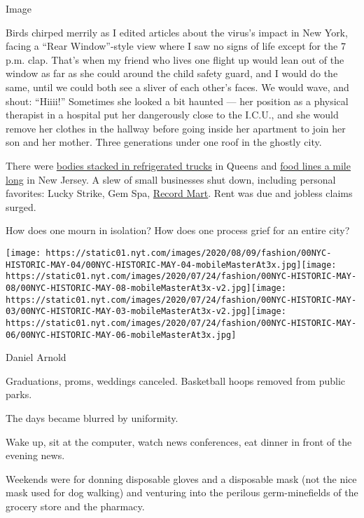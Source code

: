 Image

Birds chirped merrily as I edited articles about the virus's impact in
New York, facing a ``Rear Window''-style view where I saw no signs of
life except for the 7 p.m. clap. That's when my friend who lives one
flight up would lean out of the window as far as she could around the
child safety guard, and I would do the same, until we could both see a
sliver of each other's faces. We would wave, and shout: ``Hiiii!''
Sometimes she looked a bit haunted --- her position as a physical
therapist in a hospital put her dangerously close to the I.C.U., and she
would remove her clothes in the hallway before going inside her
apartment to join her son and her mother. Three generations under one
roof in the ghostly city.

There were
\href{https://www.nytimes.com/2020/04/30/nyregion/coronavirus-nyc-funeral-home-morgue-bodies.html}{bodies
stacked in refrigerated trucks} in Queens and
\href{https://www.nytimes.com/2020/04/30/nyregion/coronavirus-nj-hunger.html}{food
lines a mile long} in New Jersey. A slew of small businesses shut down,
including personal favorites: Lucky Strike, Gem Spa,
\href{https://untappedcities.com/2020/06/10/closed-record-mart-manhattans-oldest-record-store-located-in-times-square-subway-station/}{Record
Mart}. Rent was due and jobless claims surged.

How does one mourn in isolation? How does one process grief for an
entire city?

\texttt{[image: https://static01.nyt.com/images/2020/08/09/fashion/00NYC-HISTORIC-MAY-04/00NYC-HISTORIC-MAY-04-mobileMasterAt3x.jpg]}\texttt{[image: https://static01.nyt.com/images/2020/07/24/fashion/00NYC-HISTORIC-MAY-08/00NYC-HISTORIC-MAY-08-mobileMasterAt3x-v2.jpg]}\texttt{[image: https://static01.nyt.com/images/2020/07/24/fashion/00NYC-HISTORIC-MAY-03/00NYC-HISTORIC-MAY-03-mobileMasterAt3x-v2.jpg]}\texttt{[image: https://static01.nyt.com/images/2020/07/24/fashion/00NYC-HISTORIC-MAY-06/00NYC-HISTORIC-MAY-06-mobileMasterAt3x.jpg]}

Daniel Arnold

Graduations, proms, weddings canceled. Basketball hoops removed from
public parks.

The days became blurred by uniformity.

Wake up, sit at the computer, watch news conferences, eat dinner in
front of the evening news.

Weekends were for donning disposable gloves and a disposable mask (not
the nice mask used for dog walking) and venturing into the perilous
germ-minefields of the grocery store and the pharmacy.

